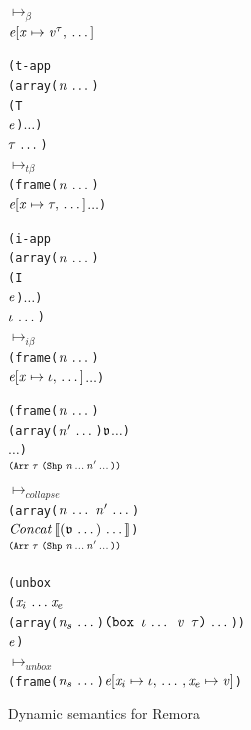 {\begin{figure}
{\begin{alltt}
        $\mapsto_{\mathit{\beta}}$
        $\seqsubst{\expr}{\var}{\val^{\type}}$
    \end{alltt}}\smallskip
    {\begin{alltt}
        (t-app
        (array ($\sequence{\nat}$)
        (T\ttlm{$\sequence{\notevar{\var}{\kind}}$}
        $\expr$) $\dots$)
        $\sequence{\type}$)\\
        $\mapsto_{\mathit{t\beta}}$
        (frame ($\sequence{\nat}$)
        $\seqsubst{\expr}{\var}{\type}$ $\dots$)
    \end{alltt}}\smallskip
    {\begin{alltt}
        (i-app
        (array ($\sequence{\nat}$)
        (I\ttlm{$\sequence{\notevar{\var}{\sort}}$}
        $\expr$) $\dots$)
        $\sequence{\idx}$)\\
        $\mapsto_{\mathit{i\beta}}$
        (frame ($\sequence{\nat}$)
        $\seqsubst{\expr}{\var}{\idx}$ $\dots$)
    \end{alltt}}\smallskip
    {\begin{alltt}
        (frame ($\sequence{\nat}$)
        (array ($\sequence{\nat'}$) $\atval$ $\dots$)
        $\dots$)%
        $^{\typearray{\type}{\idxshape{\sequence{\nat}\sequence{\nat'}}}}$\\
        $\mapsto_{\mathit{collapse}}$
        (array ($\sequence{\nat}\,\sequence{\nat'}$)
        $\mathit{Concat}\llb
        \sequence{\parens{\sequence{\atval}}}\rrb$)%
        $^{\typearray{\type}{\idxshape{\sequence{\nat}\sequence{\nat'}}}}$
    \end{alltt}}\smallskip
    {\begin{alltt}
        (unbox
        ($\sequence{\var_i}$ $\var_e$
        (array ($\sequence{\nat_s}$) $\sequence{\text{\tt(box $\sequence{\idx}$ $\val$ $\type$)}}$))
        $\expr$)\\
        $\mapsto_{\mathit{unbox}}$
        (frame ($\sequence{\nat_s}$) $\multisubst
        {\expr}
        {\sequence{\singlesubst{\var_i}{\idx},},
          \singlesubst{\var_e}{\val}}$)
    \end{alltt}}
    \caption{Dynamic semantics for Remora}
    \label{fig:DynamicSemantics}
  \end{figure}
}

